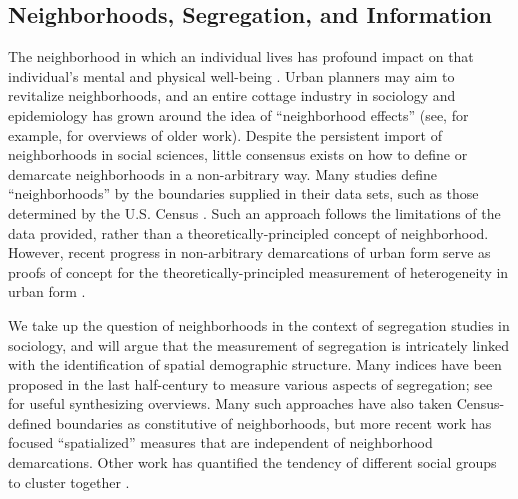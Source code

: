 \subsection{Neighborhoods, Segregation, and Information}

	The neighborhood in which an individual lives has profound impact on that individual's mental and physical well-being \cite{Ludwig2012, Ludwig2013}. Urban planners may aim to revitalize neighborhoods, and an entire cottage industry in sociology and epidemiology has grown around the idea of ``neighborhood effects'' (see, for example, \cite{DiezRoux2001, Sampson2002} for overviews of older work). Despite the persistent import of neighborhoods in social sciences, little consensus exists on how to define or demarcate neighborhoods in a non-arbitrary way. Many studies define ``neighborhoods'' by the boundaries supplied in their data sets, such as those determined by the U.S. Census \cite{Dietz2002}. Such an approach follows the limitations of the data provided, rather than a theoretically-principled concept of neighborhood. However, recent progress in non-arbitrary demarcations of urban form serve as proofs of concept for the theoretically-principled measurement of heterogeneity in urban form \cite{Rozenfeld2008,Rozenfeld2011}.

	We take up the question of neighborhoods in the context of segregation studies in sociology, and will argue that the measurement of segregation is intricately linked with the identification of spatial demographic structure. Many indices have been proposed in the last half-century to measure various aspects of segregation; see \cite{Massey1988, Reardon2002} for useful synthesizing overviews. Many such approaches have also taken Census-defined boundaries as constitutive of neighborhoods, but more recent work has focused ``spatialized'' measures that are independent of neighborhood demarcations\cite{Reardon2004, Roberto2015a, Roberto2015,Wong2004, Wong1999, Lee2008}. Other work has quantified the tendency of different social groups to cluster together \cite{Louf2015}. 

